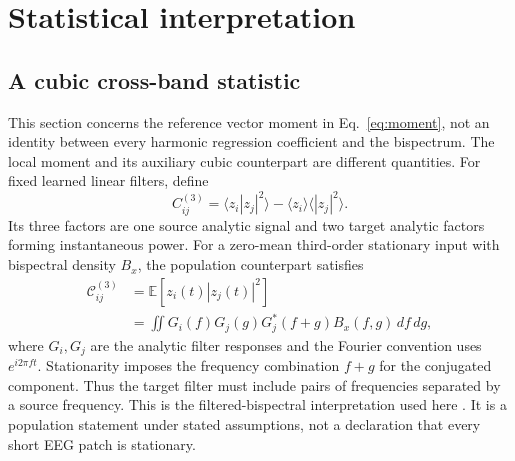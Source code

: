 \documentclass[10pt,twocolumn,letterpaper]{article}
\begin{document}
\section{Statistical interpretation}
\label{app:statistics}
\subsection{A cubic cross-band statistic}
This section concerns the reference vector moment in Eq.~\ref{eq:moment},
not an identity between every harmonic regression coefficient and the
bispectrum. The local moment and its auxiliary cubic counterpart are
different quantities. For fixed learned linear filters, define
\begin{equation}
C^{(3)}_{ij}=\langle z_i|z_j|^2\rangle
-\langle z_i\rangle\langle|z_j|^2\rangle.
\label{eq:cubic}
\end{equation}
Its three factors are one source analytic signal and two target analytic
factors forming instantaneous power. For a zero-mean third-order
stationary input with bispectral density $B_x$, the population counterpart
satisfies
\begin{equation}
\begin{aligned}
\mathcal C^{(3)}_{ij}
&=\mathbb E[z_i(t)|z_j(t)|^2]\\
&=\iint G_i(f)G_j(g)G_j^*(f+g)B_x(f,g)\,df\,dg,
\end{aligned}
\label{eq:bispectral}
\end{equation}
where $G_i,G_j$ are the analytic filter responses and the Fourier
convention uses $e^{i2\pi ft}$. Stationarity imposes the frequency
combination $f+g$ for the conjugated component. Thus the target filter
must include pairs of frequencies separated by a source frequency.
This is the filtered-bispectral interpretation used here
\citep{kovach2018bispectrum}. It is a population statement under stated
assumptions, not a declaration that every short EEG patch is stationary.
\end{document}
